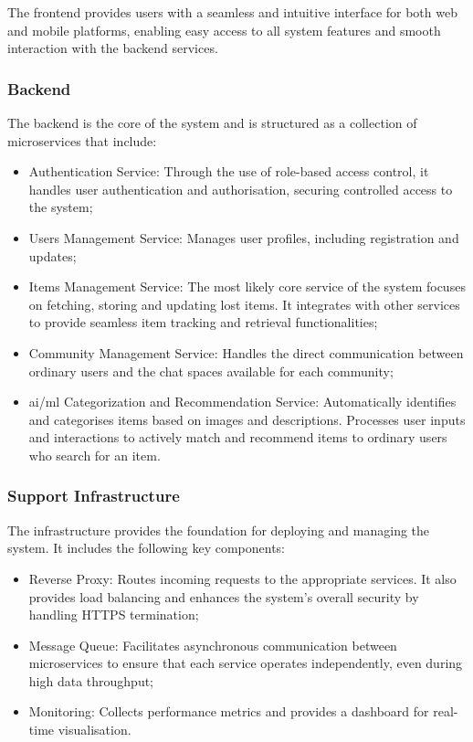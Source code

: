 The frontend provides users with a seamless and intuitive interface for both web and mobile platforms, enabling easy access to all system features and smooth interaction with the backend services.

\subsubsection{Backend}

The backend is the core of the system and is structured as a collection of microservices that include:

\begin{itemize}
    \item Authentication Service: Through the use of role-based access control, it handles user authentication and authorisation, securing controlled access to the system;
    \item Users Management Service: Manages user profiles, including registration and updates;
    \item Items Management Service: The most likely core service of the system focuses on fetching, storing and updating lost items. It integrates with other services to provide seamless item tracking and retrieval functionalities;
    \item Community Management Service: Handles the direct communication between ordinary users and the chat spaces available for each community;
    \item \ac{ai}/\ac{ml} Categorization and Recommendation Service: Automatically identifies and categorises items based on images and descriptions. Processes user inputs and interactions to actively match and recommend items to ordinary users who search for an item.
\end{itemize}

\subsubsection{Support Infrastructure}

The infrastructure provides the foundation for deploying and managing the system. It includes the following key components:

\begin{itemize}
    \item Reverse Proxy: Routes incoming requests to the appropriate services. It also provides load balancing and enhances the system's overall security by handling HTTPS termination;
    \item Message Queue: Facilitates asynchronous communication between microservices to ensure that each service operates independently, even during high data throughput;
    \item Monitoring: Collects performance metrics and provides a dashboard for real-time visualisation.
\end{itemize}

